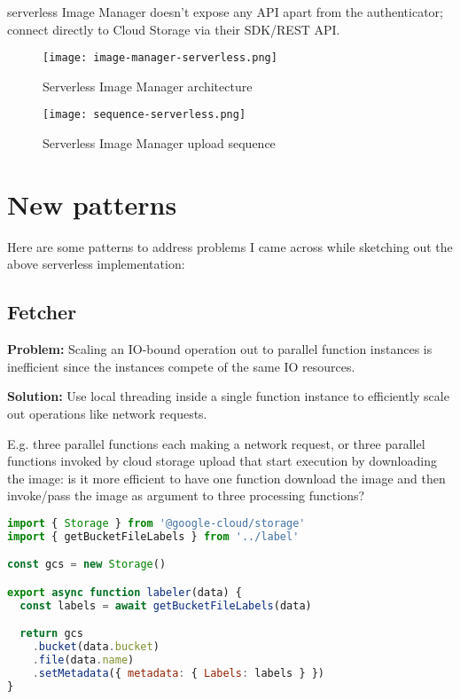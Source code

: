 serverless Image Manager doesn't expose any API apart from the authenticator; connect directly to Cloud Storage via their SDK/REST API.


\begin{figure}[h]
  \centering
  \texttt{[image: image-manager-serverless.png]}
  \caption{Serverless Image Manager architecture}
  \label{fig:serverlessArchitecture}
\end{figure}

\begin{figure}[h]
  \centering
  \texttt{[image: sequence-serverless.png]}
  \caption{Serverless Image Manager upload sequence}
  \label{fig:serverlessSequence}
\end{figure}

\section{New patterns} \label{sec:newPatterns}

Here are some patterns to address problems I came across while sketching out the above serverless implementation:

\subsection{Fetcher} \label{subsec:Fetcher}

\textbf{Problem:} Scaling an IO-bound operation out to parallel function instances is inefficient since the instances compete of the same IO resources.

\textbf{Solution:} Use local threading inside a single function instance to efficiently scale out operations like network requests.

E.g. three parallel functions each making a network request, or three parallel functions invoked by cloud storage upload that start execution by downloading the image: is it more efficient to have one function download the image and then invoke/pass the image as argument to three processing functions?

\begin{lstlisting}[language=JavaScript,caption=Image labeler function handler,captionpos=b,label=lst:labelerhandler,showstringspaces=false,belowskip=2em,frame=tb,aboveskip=2em]
import { Storage } from '@google-cloud/storage'
import { getBucketFileLabels } from '../label'

const gcs = new Storage()

export async function labeler(data) {
  const labels = await getBucketFileLabels(data)

  return gcs
    .bucket(data.bucket)
    .file(data.name)
    .setMetadata({ metadata: { Labels: labels } })
}
\end{lstlisting}


